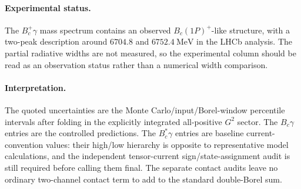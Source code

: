 \documentclass[11pt]{article}
\begin{document}
\paragraph{Experimental status.}
The \(B_c^+\gamma\) mass spectrum contains an observed \(B_c(1P)^+\)-like
structure, with a two-peak description around \(6704.8\) and
\(6752.4~\mathrm{MeV}\) in the LHCb analysis.  The partial radiative widths are
not measured, so the experimental column should be read as an observation
status rather than a numerical width comparison.

\paragraph{Interpretation.}
The quoted uncertainties are the Monte Carlo/input/Borel-window percentile
intervals after folding in the explicitly integrated all-positive \(G^2\)
sector.  The \(B_c\gamma\) entries are the controlled predictions.  The
\(B_c^\ast\gamma\) entries are baseline current-convention values: their
high/low hierarchy is opposite to representative model calculations, and the
independent tensor-current sign/state-assignment audit is still required before
calling them final.  The separate contact audits leave no ordinary two-channel
contact term to add to the standard double-Borel sum.
\end{document}
